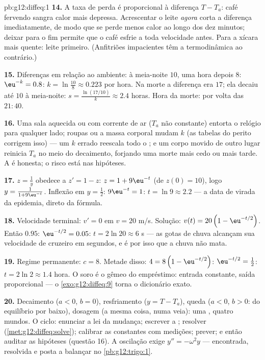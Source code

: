 \begin{solution}{pb:g12:diffeq:1}
\textbf{14.} A taxa de perda é proporcional à diferença
$T - T_a$: café fervendo sangra calor mais depressa.
Acrescentar o leite \emph{agora} corta a diferença
imediatamente, de modo que se perde menos calor ao longo dos
dez minutos; deixar para o fim permite que o café esfrie a toda
velocidade antes. Para a xícara mais quente: leite primeiro.
(Anfitriões impacientes têm a termodinâmica ao contrário.)

\textbf{15.} Diferenças em relação ao ambiente: à meia-noite
$10$, uma hora depois $8$: $\eu^{-k} = 0.8$:
$k = \ln\frac{10}{8} \approx 0.223$ por hora. Na morte a
diferença era $17$; ela decaiu até $10$ à meia-noite:
$s = \frac{\ln(17/10)}{k} \approx 2.4$ horas. Hora da morte:
por volta das $21{:}40$.

\textbf{16.} Uma sala aquecida ou com corrente de ar ($T_a$ não
constante) entorta o relógio para qualquer lado; roupas ou a
massa corporal mudam $k$ (as tabelas do perito corrigem isso)
--- um $k$ errado reescala todo o ; e um corpo movido
de outro lugar reinicia $T_a$ no meio do decaimento, forjando
uma morte mais cedo ou mais tarde. A  é honesta; o risco
está nas hipóteses.

\textbf{17.} $z = \frac1y$ obedece a $z' = 1 - z$:
$z = 1 + 9\eu^{-t}$ (de $z(0) = 10$), logo
$y = \frac{1}{1 + 9\eu^{-t}}$. Inflexão em $y = \frac12$:
$9\eu^{-t} = 1$: $t = \ln 9 \approx 2.2$ --- a data de virada
da epidemia, direto da fórmula.

\textbf{18.} Velocidade terminal: $v' = 0$ em $v = 20$ m/s.
Solução: $v(t) = 20\left(1 - \eu^{-t/2}\right)$. Então
$0.95$: $\eu^{-t/2} = 0.05$: $t = 2\ln 20 \approx 6$ s --- as
gotas de chuva alcançam sua velocidade de cruzeiro em segundos,
e é por isso que a chuva não mata.

\textbf{19.} Regime permanente: $c = 8$. Metade disso:
$4 = 8\left(1 - \eu^{-t/2}\right)$: $\eu^{-t/2} = \frac12$:
$t = 2\ln 2 \approx 1.4$ hora. O soro é o gêmeo  do
empréstimo: entrada constante, saída proporcional --- o
\cref{exo:g12:diffeq:9} torna o dicionário exato.

\textbf{20.} Decaimento ($a < 0$, $b = 0$), resfriamento
($y = T - T_a$), queda ($a < 0$, $b > 0$:  do
equilíbrio por baixo), dosagem (a mesma coisa, numa veia): uma
, quatro mundos. O ciclo: enunciar a lei da mudança;
escrever a ; resolver
(\cref{met:g12:diffeq:solve}); calibrar as constantes com
medições; prever; e então auditar as hipóteses (questão 16). A
oscilação exige $y'' = -\omega^2 y$ --- encontrada, resolvida e
posta a balançar no \cref{pb:g12:trigo:1}.
\end{solution}
